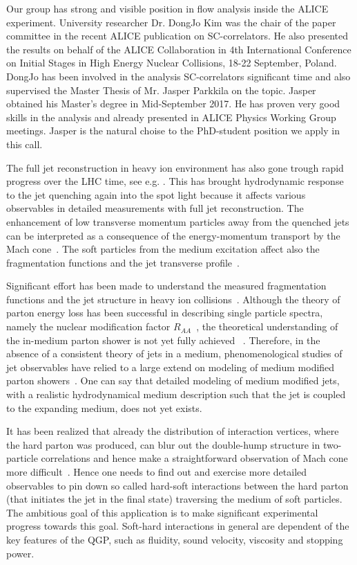 Our group has strong and visible position in flow analysis inside the ALICE experiment. University researcher Dr. DongJo Kim was the chair of the paper committee in the recent ALICE publication \cite{Acharya:2017gsw} on SC-correlators. He also presented the results on behalf of the ALICE Collaboration in 4th International Conference on Initial Stages in High Energy Nuclear Collisions, 18-22 September, Poland. DongJo has been involved in the analysis SC-correlators significant time and also supervised the Master Thesis of Mr. Jasper Parkkila on the topic. Jasper obtained his Master's degree in Mid-September 2017. He has proven very good skills in the analysis and already presented in ALICE Physics Working Group meetings. Jasper is the natural choise to the PhD-student position we apply in this call.

The full jet reconstruction in heavy ion environment has also gone trough rapid progress over the LHC time, see e.g. \cite{Abelev:2013kqa}. This has brought hydrodynamic response to the jet quenching again into the spot light because it affects various observables in detailed measurements with full jet reconstruction. The enhancement of low transverse momentum particles away from the quenched jets can be interpreted as a consequence of the energy-momentum transport by the Mach cone~\cite{Tachibana:2014lja}. 
The soft particles from the medium excitation affect also the fragmentation functions and the jet transverse profile~\cite{He:2015pra}.

Significant effort has been made to understand the measured fragmentation functions and the jet structure in heavy ion collisions~\cite{Chatrchyan:2011sx,Chatrchyan:2013kwa,Chatrchyan:2014ava,Adam:2015ewa,Khachatryan:2016erx}. Although the theory of parton energy loss has been successful in describing single particle spectra, namely the nuclear modification factor $R_{AA}$~\cite{Aamodt:2010jd}, the theoretical understanding of the in-medium parton shower is not yet fully achieved ~\cite{PhysRevLett.106.122002}. Therefore, in the absence of a consistent theory of jets in a medium, phenomenological studies of jet observables have relied to a large extend on modeling of medium modified parton showers~\cite{Armesto:2008qh,Renk:2010zx}. One can say that detailed modeling of medium modified jets, with a realistic hydrodynamical medium description such that the jet is coupled to the expanding medium, does not yet exists.

It has been realized that already the distribution of interaction vertices, where the hard parton was produced, can blur out the double-hump structure in two-particle correlations and hence make a straightforward observation of Mach cone more difficult~\cite{Tachibana:2015qxa}. Hence one needs to find out and exercise more detailed observables to pin down so called hard-soft interactions between the hard parton (that initiates the jet in the final state) traversing the medium of soft particles. The ambitious goal of this application is to make significant experimental progress towards this goal. Soft-hard interactions in general are dependent of the key features of the QGP, such as fluidity, sound velocity, viscosity and stopping power.

